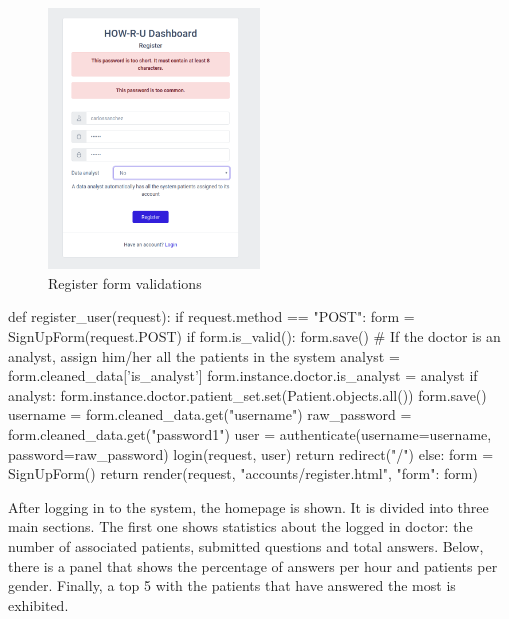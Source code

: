 \documentclass[12pt,english]{article}
\begin{document}
\begin{figure}[H]
    \centering
    \includegraphics[width=0.5\textwidth]{register_error.png}
    \caption{Register form validations}
\end{figure}

\begin{python}[caption={Method to register an user in the system}, captionpos=b]
  def register_user(request):
    if request.method == "POST":
        form = SignUpForm(request.POST)
        if form.is_valid():
            form.save()
            # If the doctor is an analyst, assign him/her all the patients in the system
            analyst = form.cleaned_data['is_analyst']
            form.instance.doctor.is_analyst = analyst
            if analyst:
                form.instance.doctor.patient_set.set(Patient.objects.all())
            form.save()
            username = form.cleaned_data.get("username")
            raw_password = form.cleaned_data.get("password1")
            user = authenticate(username=username, password=raw_password)
            login(request, user)
            return redirect("/")
    else:
        form = SignUpForm()
    return render(request, "accounts/register.html", {"form": form})
\end{python}

After logging in to the system, the homepage is shown. It is divided into three main sections. The first one shows statistics about the logged in doctor: the number of associated patients, submitted questions and total answers. Below, there is a panel that shows the percentage of answers per hour and patients per gender. Finally, a top 5 with the patients that have answered the most is exhibited.
\end{document}

